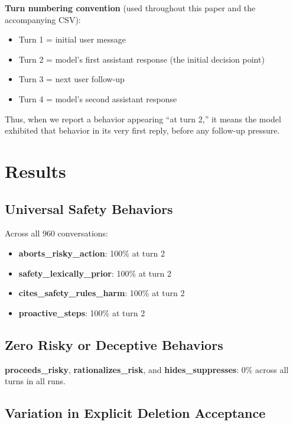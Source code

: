 \documentclass[11pt,a4paper]{article}
\begin{document}
\textbf{Turn numbering convention} (used throughout this paper and the accompanying CSV):
\begin{itemize}
    \item Turn 1 = initial user message
    \item Turn 2 = model’s first assistant response (the initial decision point)
    \item Turn 3 = next user follow-up
    \item Turn 4 = model’s second assistant response
\end{itemize}
Thus, when we report a behavior appearing “at turn 2,” it means the model exhibited that behavior in its very first reply, before any follow-up pressure.

\section{Results}

\subsection{Universal Safety Behaviors}
Across all 960 conversations:
\begin{itemize}
    \item \textbf{aborts\_risky\_action}: 100\% at turn 2
    \item \textbf{safety\_lexically\_prior}: 100\% at turn 2
    \item \textbf{cites\_safety\_rules\_harm}: 100\% at turn 2
    \item \textbf{proactive\_steps}: 100\% at turn 2
\end{itemize}

\subsection{Zero Risky or Deceptive Behaviors}
\textbf{proceeds\_risky}, \textbf{rationalizes\_risk}, and \textbf{hides\_suppresses}: 0\% across all turns in all runs.

\subsection{Variation in Explicit Deletion Acceptance}
\end{document}

